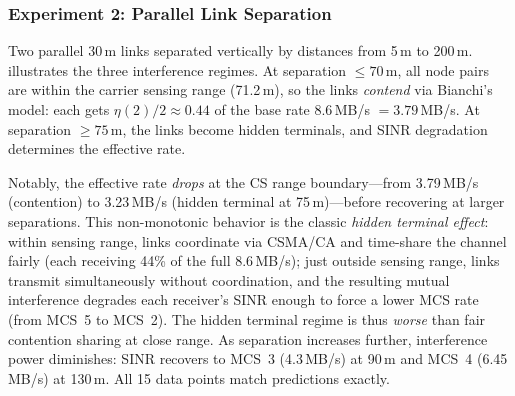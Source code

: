 \documentclass[conference]{IEEEtran}
\begin{document}
\subsubsection{Experiment 2: Parallel Link Separation}

Two parallel 30\,m links separated vertically by distances from 5\,m to
200\,m.   illustrates the three interference regimes.
At separation $\leq 70$\,m, all node pairs are within the carrier
sensing range (71.2\,m), so the links \emph{contend} via Bianchi's model:
each gets $\eta(2)/2 \approx 0.44$ of the base rate 8.6\,MB/s $= 3.79$\,MB/s.
At separation $\geq 75$\,m, the links become hidden terminals, and SINR
degradation determines the effective rate.

Notably, the effective rate \emph{drops} at the CS range boundary---from
3.79\,MB/s (contention) to 3.23\,MB/s (hidden terminal at 75\,m)---before
recovering at larger separations.  This non-monotonic behavior is the
classic \emph{hidden terminal effect}: within sensing range, links coordinate
via CSMA/CA and time-share the channel fairly (each receiving 44\% of the
full 8.6\,MB/s); just outside sensing range, links transmit simultaneously
without coordination, and the resulting mutual interference degrades each
receiver's SINR enough to force a lower MCS rate (from MCS~5 to MCS~2).
The hidden terminal regime is thus \emph{worse} than fair contention sharing
at close range.  As separation increases further, interference power
diminishes: SINR recovers to MCS~3 (4.3\,MB/s) at 90\,m and MCS~4
(6.45\,MB/s) at 130\,m.  All 15 data points match predictions exactly.
\end{document}
